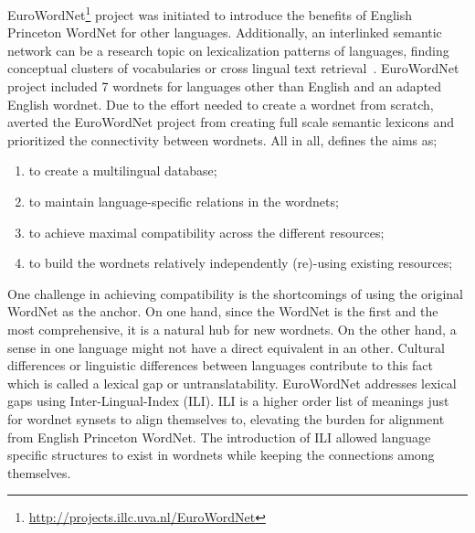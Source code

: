 EuroWordNet\footnote{\url{http://projects.illc.uva.nl/EuroWordNet}} project was initiated to introduce the benefits of English Princeton WordNet for other languages.
Additionally, an interlinked semantic network can be a research topic on lexicalization patterns of languages, finding conceptual clusters of vocabularies or cross lingual text retrieval~\cite{gonzalo_applying_1998, vossen_introduction_1998}.
EuroWordNet project included 7 wordnets for languages other than English and an adapted English wordnet.
Due to the effort needed to create a wordnet from scratch, \citeauthor{vossen_introduction_1998} averted the EuroWordNet project from creating full scale semantic lexicons and prioritized the connectivity between wordnets.
All in all, \textcite{vossen_introduction_1998} defines the aims as;
\begin{displayquote}
    \begin{enumerate}
        \item to create a multilingual database;
        \item to maintain language-specific relations in the wordnets;
        \item to achieve maximal compatibility across the different resources;
        \item to build the wordnets relatively independently (re)-using existing resources;
    \end{enumerate}
\end{displayquote}

One challenge in achieving compatibility is the shortcomings of using the original WordNet as the anchor.
On one hand, since the WordNet is the first and the most comprehensive, it is a natural hub for new wordnets.
On the other hand, a sense in one language might not have a direct equivalent in an other.
Cultural differences or linguistic differences between languages contribute to this fact~\cite{kitamura_cultural_2009} which is called a lexical gap or untranslatability.
EuroWordNet addresses lexical gaps using Inter-Lingual-Index (ILI).
ILI is a higher order list of meanings just for wordnet synsets to align themselves to, elevating the burden for alignment from English Princeton WordNet.
The introduction of ILI allowed language specific structures to exist in wordnets while keeping the connections among themselves.

